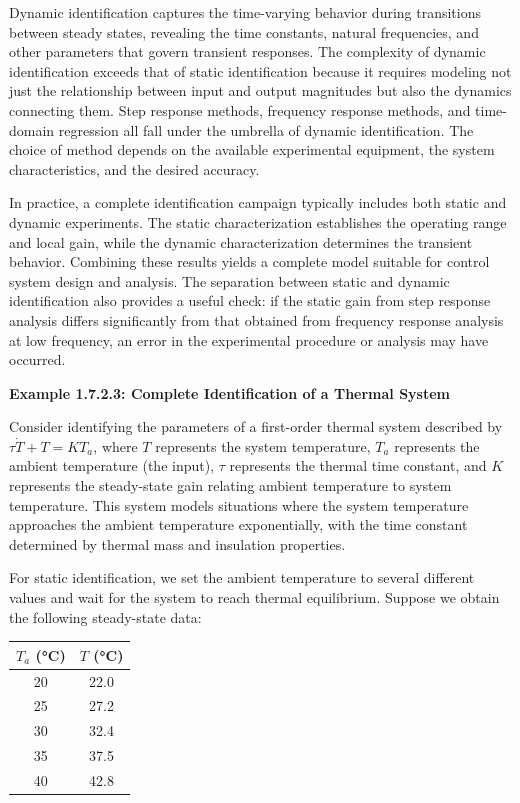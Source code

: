Dynamic identification captures the time-varying behavior during transitions between steady states, revealing the time constants, natural frequencies, and other parameters that govern transient responses. The complexity of dynamic identification exceeds that of static identification because it requires modeling not just the relationship between input and output magnitudes but also the dynamics connecting them. Step response methods, frequency response methods, and time-domain regression all fall under the umbrella of dynamic identification. The choice of method depends on the available experimental equipment, the system characteristics, and the desired accuracy.

In practice, a complete identification campaign typically includes both static and dynamic experiments. The static characterization establishes the operating range and local gain, while the dynamic characterization determines the transient behavior. Combining these results yields a complete model suitable for control system design and analysis. The separation between static and dynamic identification also provides a useful check: if the static gain from step response analysis differs significantly from that obtained from frequency response analysis at low frequency, an error in the experimental procedure or analysis may have occurred.

\textbf{Example 1.7.2.3: Complete Identification of a Thermal System}

Consider identifying the parameters of a first-order thermal system described by $\tau \dot{T} + T = K T_a$, where $T$ represents the system temperature, $T_a$ represents the ambient temperature (the input), $\tau$ represents the thermal time constant, and $K$ represents the steady-state gain relating ambient temperature to system temperature. This system models situations where the system temperature approaches the ambient temperature exponentially, with the time constant determined by thermal mass and insulation properties.

For static identification, we set the ambient temperature to several different values and wait for the system to reach thermal equilibrium. Suppose we obtain the following steady-state data:

\begin{table}[htbp]
\centering
\begin{tabular}{|c|c|}
\hline
$T_a$ (°C) & $T$ (°C) \\
\hline
20 & 22.0 \\
\hline
25 & 27.2 \\
\hline
30 & 32.4 \\
\hline
35 & 37.5 \\
\hline
40 & 42.8 \\
\hline
\end{tabular}
\label{tab:thermal_static}
\end{table}

